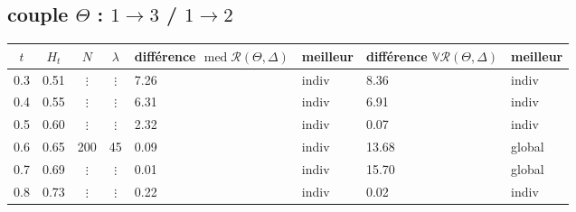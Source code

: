 \pagebreak
\subsection{couple $\Theta$ : $1 \rightarrow 3$ / $1 \rightarrow 2$}

\begin{tabularx}{\textwidth}{ccccXXXX}
	\toprule
	$t$ & $H_t$ & $N$      & $\lambda$ & différence $\operatorname{med} \mathcal R(\Theta, \Delta)$ & \textbf{meilleur} & différence  $\mathds V \mathcal R(\Theta, \Delta)$ & \textbf{meilleur} \\
	\midrule

	0.3 & 0.51  & $\vdots$ & $\vdots$  & 7.26                                                       & indiv             & 8.36                                               & indiv             \\
	0.4 & 0.55  & $\vdots$ & $\vdots$  & 6.31                                                       & indiv             & 6.91                                               & indiv             \\
	0.5 & 0.60  & $\vdots$ & $\vdots$  & 2.32                                                       & indiv             & 0.07                                               & indiv             \\
	0.6 & 0.65  & 200      & 45        & 0.09                                                       & indiv             & 13.68                                              & global            \\
	0.7 & 0.69  & $\vdots$ & $\vdots$  & 0.01                                                       & indiv             & 15.70                                              & global            \\
	0.8 & 0.73  & $\vdots$ & $\vdots$  & 0.22                                                       & indiv             & 0.02                                               & indiv             \\

	\midrule


\end{tabularx}
